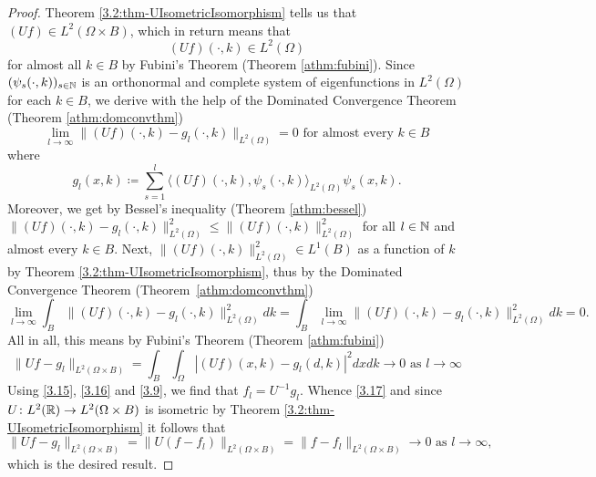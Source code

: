 \begin{theorem}
	\begin{proof}
		Theorem \ref{3.2:thm-UIsometricIsomorphism} tells us that $(Uf) \in L^{2}(\Omega \times B)$, which in return means that 
		\[ (Uf)(\cdot, k) \in L^{2}(\Omega) \]
		 for almost all $k \in B$ by Fubini's Theorem (Theorem \ref{athm:fubini}). Since $(\psi_{s}(\cdot, k))_{s \in \mathbb{N}}$ is an orthonormal and complete system of eigenfunctions in $L^{2}(\Omega)$ for each $k \in B$, we derive with the help of the Dominated Convergence Theorem (Theorem \ref{athm:domconvthm})
			\[ \lim_{l \rightarrow \infty} \| (Uf)(\cdot, k) - g_{l}(\cdot, k) \|_{L^{2}(\Omega)} = 0 \text{ for almost every } k \in B \]
		where 
			\begin{equation}
				g_{l}(x, k) \coloneqq \sum_{s=1}^{l} \langle(Uf)(\cdot, k), \psi_{s}(\cdot,k)\rangle_{L^{2}(\Omega)} \psi_{s}(x,k). \label{3.16}
			\end{equation}
		Moreover, we get by Bessel's inequality (Theorem \ref{athm:bessel}) $\| (Uf)(\cdot, k) - g_{l}(\cdot, k) \|^{2}_{L^{2}(\Omega)} \leq \| (Uf)(\cdot, k) \|^{2}_{L^{2}(\Omega)}$ for all $l \in \mathbb{N}$ and almost every $k \in B$. Next, $\|(Uf)(\cdot, k)\|^{2}_{L^{2}(\Omega)} \in L^{1}(B)$ as a function of $k$ by Theorem \ref{3.2:thm-UIsometricIsomorphism}, thus by the Dominated Convergence Theorem (Theorem \ref{athm:domconvthm})
		\[ \lim_{l \rightarrow \infty} \int_{B} \| (Uf)(\cdot, k) - g_{l}(\cdot, k) \|^{2}_{L^{2}(\Omega)} dk  = \int_{B} \lim_{l \rightarrow \infty}  \| (Uf)(\cdot, k) - g_{l}(\cdot, k) \|^{2}_{L^{2}(\Omega)} dk = 0. \]
		  All in all, this means by Fubini's Theorem (Theorem \ref{athm:fubini})
			\begin{equation}
				\| U f - g_{l} \|_{L^{2}(\Omega \times B)} = \int_{B} \int_{\Omega} \left| (Uf)(x, k) - g_{l}(d, k) \right|^{2} dx dk \rightarrow 0 \text{ as } l \rightarrow \infty \label{3.17}
			\end{equation} 
		 Using \eqref{3.15}, \eqref{3.16} and \eqref{3.9}, we find that $f_{l} = U^{-1}g_{l}$. Whence \eqref{3.17} and since $U \colon L^{2}(\mathbb{R}) \rightarrow L^{2}(\Omega \times B)$ is isometric by Theorem \ref{3.2:thm-UIsometricIsomorphism} it follows that
			\[ \| U f - g_{l} \|_{L^{2}(\Omega \times B)} = \| U(f - f_{l}) \|_{L^{2}(\Omega \times B)} = \| f - f_{l} \|_{L^{2}(\Omega \times B)} \rightarrow 0 \text{ as } l \rightarrow \infty,\]
		 which is the desired result.
	\end{proof}
\end{theorem}
